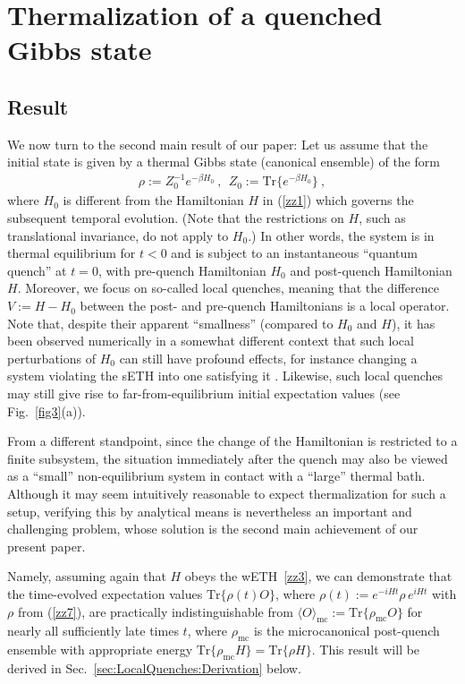 \documentclass[twocolumn,aps,prb,floatfix,superscriptaddress]{revtex4-2}
\newcommand{\<}{\left\langle}	%
\renewcommand{\>}{\right\rangle}	%
\newcommand{\tr}{\mbox{Tr}}
\newcommand{\Omc}{\langle O\rangle_{\!\mathrm{mc}}}
\newcommand{\rhomic}{\rho_{\mathrm{mc}}}
\begin{document}
\section{Thermalization of a quenched Gibbs state}
\label{sec:LocalQuenches}

\subsection{Result}

We now
turn to the second main result of our paper:
Let us assume that the initial state
is given by a thermal Gibbs state (canonical ensemble) 
of the form 
\begin{eqnarray}
\rho := Z_0^{-1} e^{-\beta H_0}\ ,\ \ Z_0:=\tr\{ e^{-\beta H_0} \}
\ ,
\label{zz7}
\end{eqnarray}
where $H_0$ is different from the Hamiltonian 
$H$ in (\ref{zz1}) which governs the subsequent temporal 
evolution.
(Note that the restrictions on $H$, such as translational 
invariance, do not apply to $H_0$.)
In other words, 
the system is in thermal equilibrium for 
$t<0$ and is subject to an instantaneous
``quantum quench'' at $t=0$, with pre-quench 
Hamiltonian $H_0$ and post-quench Hamiltonian $H$.
Moreover, we focus on so-called local quenches,
meaning that the difference $V := H - H_0$ between the 
post- and pre-quench Hamiltonians is a local operator.
Note that, despite their apparent ``smallness'' (compared to 
$H_0$ and $H$),
it has been observed numerically in a somewhat different context 
that such local perturbations of $H_0$  can
still have profound effects, for instance changing
a system violating the sETH into one satisfying 
it \cite{tor14,bre20,san20}.
Likewise, such local quenches may still give rise
to far-from-equilibrium initial expectation values
(see Fig.~\ref{fig3}(a)).

From a different standpoint, since the change of the Hamiltonian 
is restricted to a finite subsystem,
the situation immediately after the quench 
may also be viewed as a ``small'' non-equilibrium
system in contact with a ``large'' thermal bath.
Although it may seem intuitively reasonable to expect thermalization 
for such a setup, 
verifying this by analytical means is nevertheless an important and 
challenging problem, whose solution is the second main 
achievement of our present paper. 

Namely, assuming again that $H$ obeys the 
wETH~\eqref{zz3},
we can demonstrate that the time-evolved expectation values 
$\tr\{ \rho(t) O \}$, where $\rho(t) := e^{-i H t} \rho \, e^{i H t}$
with $\rho$ from (\ref{zz7}), 
are practically indistinguishable from $\Omc := \tr\{ \rhomic O \}$ 
for nearly all sufficiently late times $t$,
where $\rhomic$ 
is the microcanonical post-quench ensemble
with appropriate energy $\tr\{\rhomic H\}=\tr\{ \rho H \}$.
This result will be derived in Sec.~\ref{sec:LocalQuenches:Derivation} below.
\end{document}
